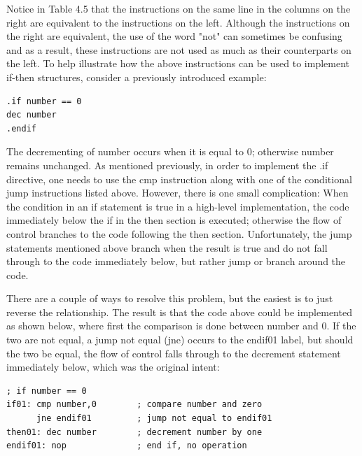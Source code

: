 \documentclass[10pt]{book}
\begin{document}
Notice in Table 4.5 that the instructions on the same line in the columns on the right are equivalent to the instructions on the left. Although the instructions on the right are equivalent, the use of the word "not" can sometimes be confusing and as a result, these instructions are not used as much as their counterparts on the left. To help illustrate how the above instructions can be used to implement if-then structures, consider a previously introduced example:

\begin{verbatim}
.if number == 0
dec number
.endif
\end{verbatim}

The decrementing of number occurs when it is equal to 0; otherwise number remains unchanged. As mentioned previously, in order to implement the .if directive, one needs to use the cmp instruction along with one of the conditional jump instructions listed above. However, there is one small complication: When the condition in an if statement is true in a high-level implementation, the code immediately below the if in the then section is executed; otherwise the flow of control branches to the code following the then section. Unfortunately, the jump statements mentioned above branch when the result is true and do not fall through to the code immediately below, but rather jump or branch around the code.

There are a couple of ways to resolve this problem, but the easiest is to just reverse the relationship. The result is that the code above could be implemented as shown below, where first the comparison is done between number and 0. If the two are not equal, a jump not equal (jne) occurs to the endif01 label, but should the two be equal, the flow of control falls through to the decrement statement immediately below, which was the original intent:

\begin{verbatim}
; if number == 0
if01: cmp number,0        ; compare number and zero
      jne endif01         ; jump not equal to endif01
then01: dec number        ; decrement number by one
endif01: nop              ; end if, no operation
\end{verbatim}
\end{document}
